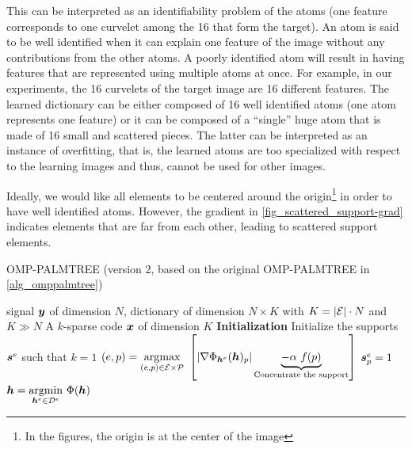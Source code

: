 \noindent
This can be interpreted as an identifiability problem of the atoms (one feature corresponds to one curvelet among the 16 that form the target).
An atom is said to be well identified when it can explain one feature of the image without any contributions from the other atoms. A poorly identified atom will result in having features that are represented using multiple atoms at once. For example, in our experiments, the 16 curvelets of the target image are 16 different features. The learned dictionary can be either composed of 16 well identified atoms (one atom represents one feature) or it can be composed of a “single” huge atom that is made of 16 small and scattered pieces.
The latter can be interpreted as an instance of overfitting, that is, the learned atoms are too specialized with respect to the learning images and thus, cannot be used for other images.

\noindent
Ideally, we would like all elements to be centered around the origin\footnote{In the figures, the origin is at the center of the image} in order to have well identified atoms. However, the gradient in \cref{fig_scattered_support-grad} indicates elements that are far from each other, leading to scattered support elements.

\begin{algorithm}[!ht]
    \caption{OMP-PALMTREE (version 2, based on the original OMP-PALMTREE in \cref{alg_omppalmtree})}\label{alg_omppalmtree2}
  \begin{algorithmic}[1]
    \Input signal $\bm{y}$ of dimension $N$, dictionary of 
   dimension $N \times K$ with $K = |\mathcal E| \cdot N$ and $K \gg N$
    \Output A $k$-sparse code $\bm{x}$ of dimension $K$
    \State \textbf{Initialization} Initialize the supports $\bm{s}^e$ such that $k=1$
      \State $(e,p) = \underset{(e,p) \in \mathcal E \times \mathcal P}{\operatorname*{\arg\!\max}}~ \left[ |\nabla \Phi_{\bm{h}^e}(\bm{h})_p| \underbrace{ - \alpha~f(p)}_{\text{Concentrate the support}} \right]$\label{alg_omppalmtree2_find}
      \State $\bm{s}^e_p = 1$
      \State $\bm{h} = \underset{\bm{h}^e \in {\mathcal D}^e}{\operatorname{argmin}}~ \Phi(\bm{h})$\label{alg_omppalmtree2_ftl}
    \EndFor
  \end{algorithmic}
\end{algorithm}

